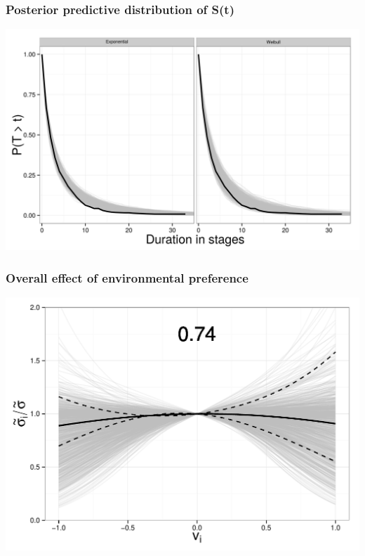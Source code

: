 \documentclass{beamer}
\begin{document}
\begin{frame}
  \frametitle{Posterior predictive distribution of S(t)}
  
  \begin{center}
    \includegraphics[width = \textwidth,height = 0.8\textheight,keepaspectratio = true]{figure/survival_curves}
  \end{center}
\end{frame}

\begin{frame}
  \frametitle{Overall effect of environmental preference}
  
  \includegraphics[width = \textwidth,height = 0.8\textheight,keepaspectratio = true]{figure/environ_quad}
\end{frame}
\end{document}
